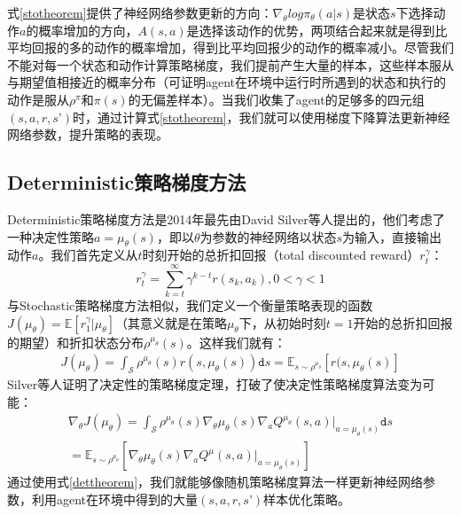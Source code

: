 式\ref{stotheorem}提供了神经网络参数更新的方向：$\nabla_\theta log \pi_\theta(a\vert s)$是状态$s$下选择动作$a$的概率增加的方向，$A(s,a)$是选择该动作的优势，两项结合起来就是得到比平均回报的多的动作的概率增加，得到比平均回报少的动作的概率减小。尽管我们不能对每一个状态和动作计算策略梯度，我们提前产生大量的样本，这些样本服从与期望值相接近的概率分布（可证明agent在环境中运行时所遇到的状态和执行的动作是服从$\rho^\pi$和$\pi(s)$的无偏差样本）。当我们收集了agent的足够多的四元组$(s,a,r,s’)$时，通过计算式\ref{stotheorem}，我们就可以使用梯度下降算法更新神经网络参数，提升策略的表现。
\subsection{Deterministic策略梯度方法}
Deterministic策略梯度方法\cite{silver2014deter}是2014年最先由David Silver等人提出的，他们考虑了一种决定性策略$a = \mu_\theta(s)$，即以$\theta$为参数的神经网络以状态$s$为输入，直接输出动作$a$。我们首先定义从$t$时刻开始的总折扣回报（total discounted reward）$r^\gamma_t$：
\begin{equation}
r^\gamma_t = \sum^\infty_{k=t}\gamma^{k-t} r(s_k,a_k), 0<\gamma<1
\end{equation}
与Stochastic策略梯度方法相似，我们定义一个衡量策略表现的函数$J(\mu_\theta) = \mathbb{E}[r^\gamma_1 \vert \mu_\theta]$（其意义就是在策略$\mu_\theta$下，从初始时刻$t=1$开始的总折扣回报的期望）和折扣状态分布$\rho^{\mu_\theta}(s)$。这样我们就有：
\begin{equation}
\begin{split}
J(\mu_\theta) = \int_\mathcal{S}\rho^{\mu_\theta}(s) r(s, \mu_\theta(s))\texttt{d}s = \mathbb{E}_{s\sim \rho^{\mu_\theta}}[r(s, \mu_\theta(s)]
\end{split}
\label{detobj}
\end{equation}
Silver等人证明了决定性的策略梯度定理，打破了使决定性策略梯度算法变为可能：
\begin{equation}
\begin{split}
\nabla_\theta J(\mu_\theta) = \int_\mathcal{S}\rho^{\mu_\theta}(s)\nabla_\theta \mu_\theta(s) \nabla_a Q^{\mu_\theta}(s,a) \vert_{a = \mu_\theta(s)} \texttt{d}s \\  = \mathbb{E}_{s\sim \rho^{\mu_\theta}}[\nabla_\theta \mu_\theta(s) \nabla_a Q^\mu(s,a) \vert_{a = \mu_\theta(s)}]
\end{split}
\label{dettheorem}
\end{equation}
通过使用式\ref{dettheorem}，我们就能够像随机策略梯度算法一样更新神经网络参数，利用agent在环境中得到的大量$(s,a,r,s’)$样本优化策略。
